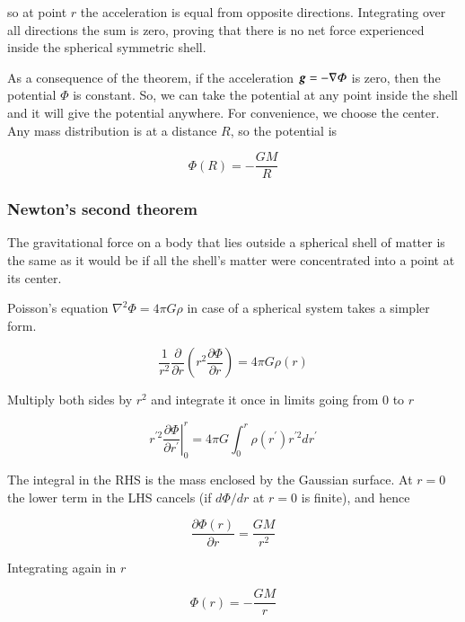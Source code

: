 so at point $r$ the acceleration is equal from opposite directions. Integrating over all directions the sum is zero, proving that there is no net force experienced inside the spherical symmetric shell. 

As a consequence of the theorem, if the acceleration ${\boldsymbol{g}}=-\nabla\varPhi$ is zero, then the potential $\varPhi$ is constant. So, we can take the potential at any point inside the shell and it will give the potential anywhere. For convenience, we choose the center. Any mass distribution is at a distance $R$, so the potential is 

\begin{equation}
\boxed{\varPhi(R) = - \frac{GM}{R}}
\end{equation}


\subsubsection{Newton's second theorem}

The gravitational force on a body that lies outside a spherical shell of matter is the same as it would be if all the shell's matter were concentrated into a point at its center. 

Poisson's equation $\nabla^2\varPhi=  4\pi G \rho$ in case of a spherical system takes a simpler form.

\begin{equation}
\frac{1}{r^2}\frac{\partial}{\partial r} \left( r^2 \frac{\partial \varPhi}{\partial r} \right) = 4\pi G \rho(r)
\end{equation}

Multiply both sides by $r^2$ and integrate it once in limits going from $0$ to $r$

\begin{equation}
\left. r^{\prime 2} \frac{\partial \varPhi}{\partial r^\prime} \right\vert_0^{r} = 4\pi G \int_0^r \rho(r^\prime) r^{\prime 2} dr^\prime 
\end{equation}

The integral in the RHS is the mass enclosed by the Gaussian surface. At $r=0$ the lower term in the LHS cancels (if $d\varPhi/dr$ at $r=0$ is finite), and hence

\begin{equation}
\frac{\partial \varPhi(r)}{\partial r}  = \frac{GM}{r^2} 
\end{equation}

Integrating again in $r$

\begin{equation}
\varPhi(r) = -\frac{GM}{r}
\end{equation}

